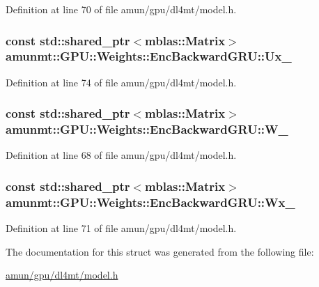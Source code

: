 Definition at line 70 of file amun/gpu/dl4mt/model.\+h.

\subsubsection[{\texorpdfstring{Ux\+\_\+}{Ux_}}]{\setlength{\rightskip}{0pt plus 5cm}const std\+::shared\+\_\+ptr$<${\bf mblas\+::\+Matrix}$>$ amunmt\+::\+G\+P\+U\+::\+Weights\+::\+Enc\+Backward\+G\+R\+U\+::\+Ux\+\_\+}\hypertarget{structamunmt_1_1GPU_1_1Weights_1_1EncBackwardGRU_a29cf7751c9605ab9ae1af584e9b69099}{}\label{structamunmt_1_1GPU_1_1Weights_1_1EncBackwardGRU_a29cf7751c9605ab9ae1af584e9b69099}


Definition at line 74 of file amun/gpu/dl4mt/model.\+h.

\subsubsection[{\texorpdfstring{W\+\_\+}{W_}}]{\setlength{\rightskip}{0pt plus 5cm}const std\+::shared\+\_\+ptr$<${\bf mblas\+::\+Matrix}$>$ amunmt\+::\+G\+P\+U\+::\+Weights\+::\+Enc\+Backward\+G\+R\+U\+::\+W\+\_\+}\hypertarget{structamunmt_1_1GPU_1_1Weights_1_1EncBackwardGRU_a08f1b0ada0b72591836d6b995dcd38f5}{}\label{structamunmt_1_1GPU_1_1Weights_1_1EncBackwardGRU_a08f1b0ada0b72591836d6b995dcd38f5}


Definition at line 68 of file amun/gpu/dl4mt/model.\+h.

\subsubsection[{\texorpdfstring{Wx\+\_\+}{Wx_}}]{\setlength{\rightskip}{0pt plus 5cm}const std\+::shared\+\_\+ptr$<${\bf mblas\+::\+Matrix}$>$ amunmt\+::\+G\+P\+U\+::\+Weights\+::\+Enc\+Backward\+G\+R\+U\+::\+Wx\+\_\+}\hypertarget{structamunmt_1_1GPU_1_1Weights_1_1EncBackwardGRU_ac82b3d4dc2604af39bcc763498b2fab4}{}\label{structamunmt_1_1GPU_1_1Weights_1_1EncBackwardGRU_ac82b3d4dc2604af39bcc763498b2fab4}


Definition at line 71 of file amun/gpu/dl4mt/model.\+h.



The documentation for this struct was generated from the following file\+:\begin{DoxyCompactItemize}
\item 
\hyperlink{amun_2gpu_2dl4mt_2model_8h}{amun/gpu/dl4mt/model.\+h}\end{DoxyCompactItemize}
